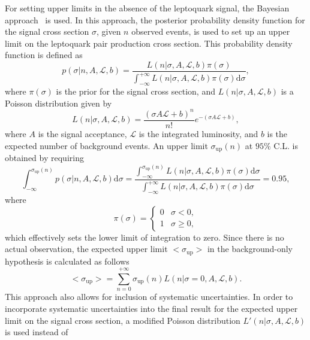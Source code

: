 For setting upper limits in the absence of the leptoquark signal, the Bayesian approach~\cite{ref:bayes} is used. In this approach, the
posterior probability density function for the signal cross section $\sigma$, given $n$ observed events, is used to set up an upper limit 
on the leptoquark pair production cross section. This probability density function is defined as 
\begin{equation}
p(\sigma|n,A,\mathcal{L},b)=\frac{L(n|\sigma,A,\mathcal{L},b)\pi(\sigma)}{\int_{-\infty}^{+\infty}L(n|\sigma,A,\mathcal{L},b)\pi(\sigma)\mathrm{d}\sigma},
\end{equation}
where $\pi(\sigma)$ is the prior for the signal cross section, and $L(n|\sigma,A,\mathcal{L},b)$ is a Poisson distribution given by
\begin{equation}
L(n|\sigma,A,\mathcal{L},b)=\frac{(\sigma A\mathcal{L}+b)^n}{n!}e^{-(\sigma A\mathcal{L}+b)},
\end{equation}
where $A$ is the signal acceptance, $\mathcal{L}$ is the integrated luminosity, and $b$ is the expected number of background events.
An upper limit $\sigma_\text{up}(n)$ at $95\%$ C.L. is obtained by requiring
\begin{equation}
\int_{-\infty}^{\sigma_\text{up}(n)}p(\sigma|n,A,\mathcal{L},b)\mathrm{d}\sigma=\frac{\int_{-\infty}^{\sigma_\text{up}(n)}L(n|\sigma,A,\mathcal{L},b)\pi(\sigma)\mathrm{d}\sigma}{\int_{-\infty}^{+\infty}L(n|\sigma,A,\mathcal{L},b)\pi(\sigma)\mathrm{d}\sigma}=0.95, 
\label{eq:xs_up}
\end{equation}
where
\begin{equation}
\pi(\sigma)=\begin{cases}
          0&  \sigma<0,\\
          1&  \sigma\geq 0,
\end{cases}
\end{equation}
which effectively sets the lower limit of integration to zero. Since there is no actual observation, the expected 
upper limit $\mathrm{<}\sigma_\text{up}\mathrm{>}$ in the background-only hypothesis is calculated as follows
\begin{equation}
\mathrm{<}\sigma_\text{up}\mathrm{>}=\sum_{n=0}^{+\infty} \sigma_\text{up}(n)L(n|\sigma=0,A,\mathcal{L},b).
\end{equation}
This approach also allows for inclusion of systematic uncertainties. In order to incorporate systematic uncertainties into the final
result for the expected upper limit on the signal cross section, a modified Poisson distribution $L'(n|\sigma,A,\mathcal{L},b)$ is used instead of

